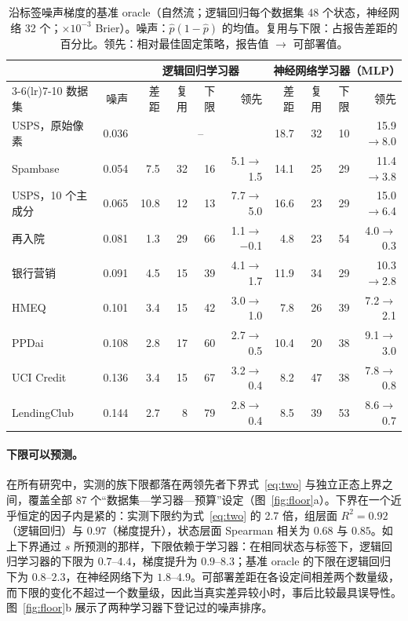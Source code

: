 \documentclass[runningheads]{llncs}
\begin{document}
\begin{table}[t]
\caption{沿标签噪声梯度的基准 oracle（自然流；逻辑回归每个数据集 48 个状态，神经网络 32 个；$\times10^{-3}$ Brier）。噪声：$\hat p(1-\hat p)$ 的均值。复用与下限：占报告差距的百分比。领先：相对最佳固定策略，报告值 $\to$ 可部署值。}
\label{tab:gradient}
\centering\scriptsize
\setlength{\tabcolsep}{2.6pt}
\begin{tabular}{lrrrrrrrrr}
\toprule
& & \multicolumn{4}{c}{逻辑回归学习器} & \multicolumn{4}{c}{神经网络学习器（MLP）} \\
\cmidrule(lr){3-6}\cmidrule(lr){7-10}
数据集 & 噪声 & 差距 & 复用 & 下限 & 领先 & 差距 & 复用 & 下限 & 领先 \\
\midrule
USPS，原始像素 & 0.036 & \multicolumn{4}{c}{--} & 18.7 & 32 & 10 & 15.9$\to$8.0 \\
Spambase & 0.054 & 7.5 & 32 & 16 & 5.1$\to$1.5 & 14.1 & 25 & 29 & 11.4$\to$3.8 \\
USPS，10 个主成分 & 0.065 & 10.8 & 12 & 13 & 7.7$\to$5.0 & 16.6 & 23 & 29 & 15.0$\to$6.4 \\
再入院 & 0.081 & 1.3 & 29 & 66 & 1.1$\to$$-$0.1 & 4.8 & 23 & 54 & 4.0$\to$0.3 \\
银行营销 & 0.091 & 4.5 & 15 & 39 & 4.1$\to$1.7 & 11.9 & 34 & 29 & 10.3$\to$2.8 \\
HMEQ & 0.101 & 3.4 & 15 & 42 & 3.0$\to$1.0 & 7.8 & 26 & 39 & 7.2$\to$2.1 \\
PPDai & 0.108 & 2.8 & 17 & 60 & 2.7$\to$0.5 & 10.4 & 20 & 38 & 9.1$\to$3.0 \\
UCI Credit & 0.136 & 3.4 & 15 & 67 & 3.2$\to$0.4 & 8.2 & 47 & 38 & 7.8$\to$0.8 \\
LendingClub & 0.144 & 2.7 & 8 & 79 & 2.8$\to$0.4 & 8.5 & 39 & 53 & 8.6$\to$0.7 \\
\bottomrule
\end{tabular}
\end{table}

\paragraph{下限可以预测。}在所有研究中，实测的族下限都落在两领先者下界式~\eqref{eq:two} 与独立正态上界之间，覆盖全部 87 个“数据集—学习器—预算”设定（图~\ref{fig:floor}a）。下界在一个近乎恒定的因子内是紧的：实测下限约为式~\eqref{eq:two} 的 2.7 倍，组层面 $R^2=0.92$（逻辑回归）与 $0.97$（梯度提升），状态层面 Spearman 相关为 $0.68$ 与 $0.85$。如上下界通过 $s$ 所预测的那样，下限依赖于学习器：在相同状态与标签下，逻辑回归学习器的下限为 $0.7$--$4.4$，梯度提升为 $0.9$--$8.3$；基准 oracle 的下限在逻辑回归下为 $0.8$--$2.3$，在神经网络下为 $1.8$--$4.9$。可部署差距在各设定间相差两个数量级，而下限的变化不超过一个数量级，因此当真实差异较小时，事后比较最具误导性。图~\ref{fig:floor}b 展示了两种学习器下登记过的噪声排序。
\end{document}
